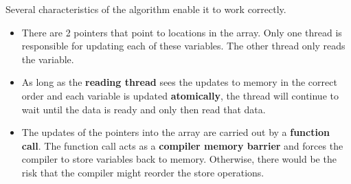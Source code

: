 \documentclass[12pt,a4paper]{report}
\begin{document}
Several characteristics of the algorithm enable it to work correctly.
\begin{itemize}
	\item There are 2 pointers that point to locations in the array. Only one thread is responsible for updating each of these variables. The other thread only reads the variable.
	\item As long as the \textbf{reading thread} sees the updates to memory in the correct order and each variable is updated \textbf{atomically}, the thread will continue to wait until the data is ready and only then read that data.
	\item The updates of the pointers into the array are carried out by a \textbf{function call}. The function call acts as a \textbf{compiler memory barrier} and forces the compiler to store variables back to memory. Otherwise, there would be the risk that the compiler might reorder the store operations.
\end{itemize}
\end{document}
